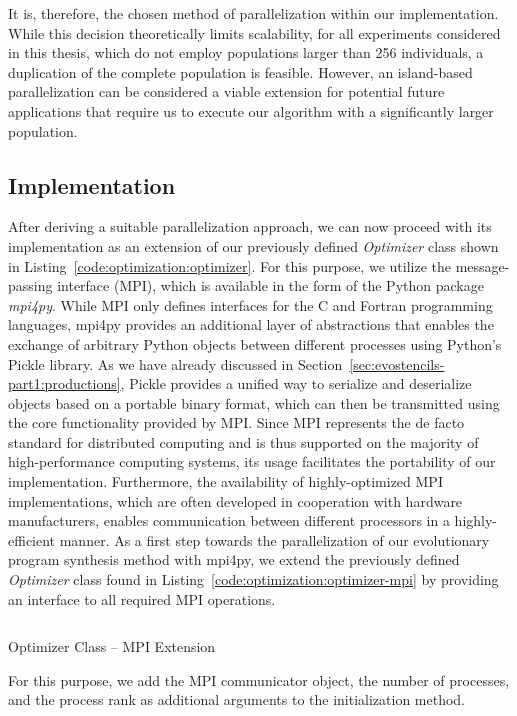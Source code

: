 It is, therefore, the chosen method of parallelization within our implementation.
While this decision theoretically limits scalability, for all experiments considered in this thesis, which do not employ populations larger than 256 individuals, a duplication of the complete population is feasible.
However, an island-based parallelization can be considered a viable extension for potential future applications that require us to execute our algorithm with a significantly larger population.

\subsection{Implementation}
After deriving a suitable parallelization approach, we can now proceed with its implementation as an extension of our previously defined \emph{Optimizer} class shown in Listing~\ref{code:optimization:optimizer}.
For this purpose, we utilize the message-passing interface (MPI), which is available in the form of the Python package \emph{mpi4py}.
While MPI only defines interfaces for the C and Fortran programming languages, mpi4py provides an additional layer of abstractions that enables the exchange of arbitrary Python objects between different processes using Python's Pickle library.
As we have already discussed in Section~\ref{sec:evostencils-part1:productions}, Pickle provides a unified way to serialize and deserialize objects based on a portable binary format, which can then be transmitted using the core functionality provided by MPI.
Since MPI represents the de facto standard for distributed computing and is thus supported on the majority of high-performance computing systems, its usage facilitates the portability of our implementation.
Furthermore, the availability of highly-optimized MPI implementations, which are often developed in cooperation with hardware manufacturers, enables communication between different processors in a highly-efficient manner.
As a first step towards the parallelization of our evolutionary program synthesis method with mpi4py, we extend the previously defined \emph{Optimizer} class found in Listing~\ref{code:optimization:optimizer-mpi} by providing an interface to all required MPI operations. 
\begin{listing}
	\inputminted[linenos]{python}{evostencils/optimization/optimizer_mpi.py}
	\caption{Optimizer Class -- MPI Extension}
	\label{code:optimization:optimizer-mpi}
\end{listing}
For this purpose, we add the MPI communicator object, the number of processes, and the process rank as additional arguments to the initialization method.

